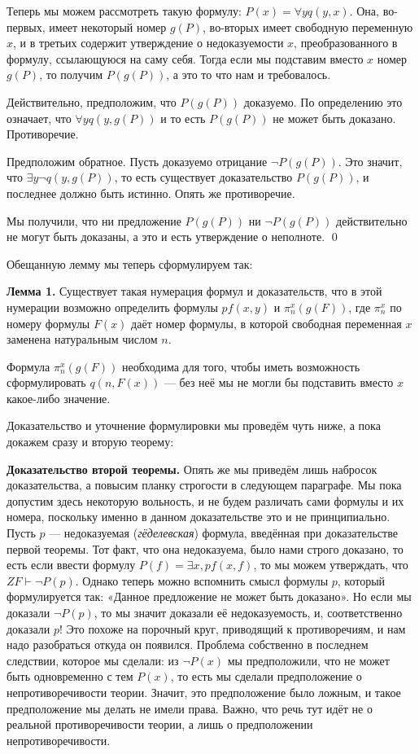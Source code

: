 Теперь мы можем рассмотреть такую формулу: $P(x) = \forall y q(y, x)$. Она, во-первых, имеет некоторый номер $g(P)$, во-вторых имеет свободную переменную $x$, и в третьих содержит утверждение о недоказуемости $x$, преобразованного в формулу, ссылающуюся на саму себя. Тогда если мы подставим вместо $x$ номер $g(P)$, то получим $P(g(P))$, а это то что нам и требовалось.

Действительно, предположим, что $P(g(P))$ доказуемо. По определению это означает, что $\forall y q(y, g(P))$ и то есть $P(g(P))$ не может быть доказано. Противоречие.

Предположим обратное. Пусть доказуемо отрицание $\neg P(g(P))$. Это значит, что $\exists y \neg q(y, g(P))$, то есть существует доказательство $P(g(P))$, и последнее должно быть истинно. Опять же противоречие.

Мы получили, что ни предложение $P(g(P))$ ни $\neg P(g(P))$ действительно не могут быть доказаны, а это и есть утверждение о неполноте. \qed

Обещанную лемму мы теперь сформулируем так:

{\bfseries Лемма 1.} Существует такая нумерация формул и доказательств, что в этой нумерации возможно определить формулы $pf(x, y)$ и $\pi^x_n(g(F))$, где $\pi^x_n$ по номеру формулы $F(x)$ даёт номер формулы, в которой свободная переменная $x$ заменена натуральным числом $n$.

Формула $\pi^x_n(g(F))$ необходима для того, чтобы иметь возможность сформулировать $q(n, F(x))$ — без неё мы не могли бы подставить вместо $x$ какое-либо значение.

Доказательство и уточнение формулировки мы проведём чуть ниже, а пока докажем сразу и вторую теорему:

{\bfseries Доказательство второй теоремы.} Опять же мы приведём лишь набросок доказательства, а повысим планку строгости в следующем параграфе. Мы пока допустим здесь некоторую вольность, и не будем различать сами формулы и их номера, поскольку именно в данном доказательстве это и не принципиально. Пусть $p$ — недоказуемая ({\slshape гёделевская}) формула, введённая при доказательстве первой теоремы. Тот факт, что она недоказуема, было нами строго доказано, то есть если ввести формулу $P(f) = \exists x, pf(x, f)$, то мы можем утверждать, что $ZF\vdash \neg P(p)$. Однако теперь можно вспомнить смысл формулы $p$, который формулируется так: «Данное предложение не может быть доказано». Но если мы доказали $\neg P(p)$, то мы значит доказали её недоказуемость, и, соответственно доказали $p$! Это похоже на порочный круг, приводящий к противоречиям, и нам надо разобраться откуда он появился. Проблема собственно в последнем следствии, которое мы сделали: из $\neg P(x)$ мы предположили, что не может быть одновременно с тем $P(x)$, то есть мы сделали предположение о непротиворечивости теории. Значит, это предположение было ложным, и такое предположение мы делать не имели права. Важно, что речь тут идёт не о реальной противоречивости теории, а лишь о предположении непротиворечивости.

